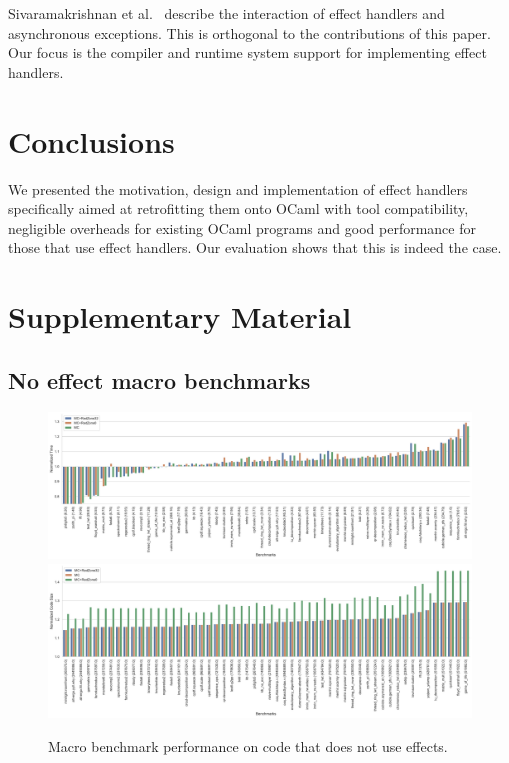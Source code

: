 \documentclass[sigplan,10pt,review,anonymous]{acmart}\settopmatter{printfolios=true,printccs=false,printacmref=false}
\begin{document}
Sivaramakrishnan et al.~\cite{TFP17} describe the interaction of effect
handlers and asynchronous exceptions. This is orthogonal to the contributions
of this paper. Our focus is the compiler and runtime system support for
implementing effect handlers.

\section{Conclusions}
\label{sec:conc}

We presented the motivation, design and implementation of effect handlers
specifically aimed at retrofitting them onto OCaml with tool compatibility,
negligible overheads for existing OCaml programs and good performance for those
that use effect handlers. Our evaluation shows that this is indeed the case.

\clearpage




\clearpage

\section*{Supplementary Material}
\setcounter{figure}{0}

\subsection*{No effect macro benchmarks}

\begin{figure}
	\begin{minipage}{\linewidth}
	\includegraphics[width=\linewidth]{sandmark-notebook/sandmark_time}
	\includegraphics[width=\linewidth]{sandmark-notebook/sandmark_codesize}
	\end{minipage}
	\caption{Macro benchmark performance on code that does not use effects.}
	\label{res:macro}
\end{figure}
\end{document}
